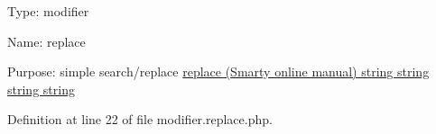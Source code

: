 \-Type\-: modifier\par
 \-Name\-: replace\par
 \-Purpose\-: simple search/replace \hyperlink{}{replace (\-Smarty online manual)  string  string  string  string }

\-Definition at line 22 of file modifier.\-replace.\-php.


